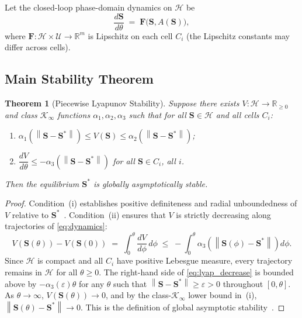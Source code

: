 \documentclass[10pt,twocolumn]{article}
\theoremstyle{plain}
\newtheorem{theorem}{Theorem}[section]
\theoremstyle{definition}
\theoremstyle{remark}
\newcommand{\R}{\mathbb{R}}
\newcommand{\Hcal}{\mathcal{H}}
\newcommand{\Ucal}{\mathcal{U}}
\newcommand{\norm}[1]{\left\|#1\right\|}
\newcommand{\Sstar}{\mathbf{S}^{*}}
\begin{document}
Let the closed-loop phase-domain dynamics on $\Hcal$ be
\begin{equation}
  \frac{d\mathbf{S}}{d\theta} \;=\; \mathbf{F}\!\bigl(\mathbf{S},
                                    A(\mathbf{S})\bigr),
  \label{eq:dynamics}
\end{equation}
where $\mathbf{F}: \Hcal \times \Ucal \to \R^m$ is Lipschitz on each
cell $C_i$ (the Lipschitz constants may differ across cells).

\subsection{Main Stability Theorem}
\label{ssec:main}

\begin{theorem}[Piecewise Lyapunov Stability]
\label{thm:pwlyap}
Suppose there exists $V: \Hcal \to \R_{\geq 0}$ and class
$\mathcal{K}_\infty$ functions $\alpha_1, \alpha_2, \alpha_3$ such
that for all $\mathbf{S} \in \Hcal$ and all cells $C_i$:
\begin{enumerate}
  \item[(i)] $\alpha_1\!\left(\norm{\mathbf{S}-\Sstar}\right)
             \leq V(\mathbf{S})
             \leq \alpha_2\!\left(\norm{\mathbf{S}-\Sstar}\right)$;
  \item[(ii)] $\dfrac{dV}{d\theta}
              \leq -\alpha_3\!\left(\norm{\mathbf{S}-\Sstar}\right)$
              for all $\mathbf{S} \in C_i$, all $i$.
\end{enumerate}
Then the equilibrium $\Sstar$ is globally asymptotically stable.
\end{theorem}

\begin{proof}
Condition~(i) establishes positive definiteness and radial unboundedness
of $V$ relative to $\Sstar$~\cite{Khalil2002}.  Condition~(ii) ensures
that $V$ is strictly decreasing along trajectories of \eqref{eq:dynamics}:
\begin{equation}
  V(\mathbf{S}(\theta)) - V(\mathbf{S}(0))
  \;=\; \int_0^\theta \frac{dV}{d\phi}\,d\phi
  \;\leq\; -\int_0^\theta
    \alpha_3\!\left(\norm{\mathbf{S}(\phi)-\Sstar}\right) d\phi.
  \label{eq:lyap_decrease}
\end{equation}
Since $\Hcal$ is compact and all $C_i$ have positive Lebesgue measure,
every trajectory remains in $\Hcal$ for all $\theta \geq 0$.  The
right-hand side of \eqref{eq:lyap_decrease} is bounded above by
$-\alpha_3(\varepsilon)\theta$ for any $\theta$ such that
$\norm{\mathbf{S}-\Sstar} \geq \varepsilon > 0$ throughout $[0,\theta]$.
As $\theta \to \infty$, $V(\mathbf{S}(\theta)) \to 0$, and by the
class-$\mathcal{K}_\infty$ lower bound in~(i),
$\norm{\mathbf{S}(\theta) - \Sstar} \to 0$.  This is the definition of
global asymptotic stability~\cite{Khalil2002}.
\end{proof}
\end{document}
